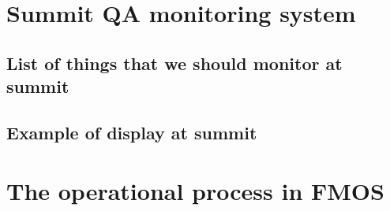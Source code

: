 \documentclass[a4paper]{article}
\begin{document}
\section{Summit QA monitoring system}
\subsection{List of things that we should monitor at summit}

\subsection{Example of display at summit}

\section{The operational process in FMOS}
\subsection{}
\end{document}
